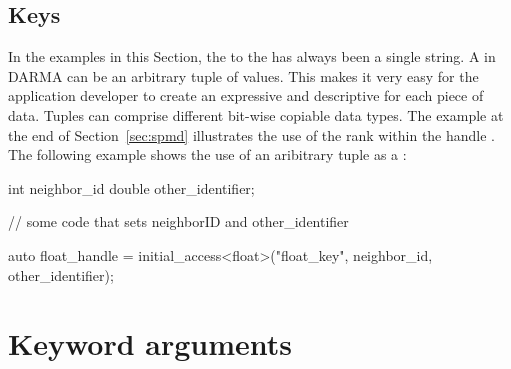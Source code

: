 \subsection{Keys}
\label{subsec:keys}
In the examples in this Section, the  to the
 has always been a single string. 
A  in DARMA 
can be an arbitrary \gls{tuple} of values.  This 
makes it very easy for the application developer to create an expressive
and descriptive  for each piece of data.  Tuples can comprise
different bit-wise copiable data types.  The example at the end of
Section~\ref{sec:spmd} illustrates the use of the \gls{rank} within the handle
.  The following example shows the use of an
aribitrary \gls{tuple} as a :
\begin{CppCode}
  int neighbor_id
  double other_identifier;

  // some code that sets neighborID and other_identifier
  
  auto float_handle = initial_access<float>("float_key", 
                                            neighbor_id, 
                                            other_identifier);
\end{CppCode}


\section{Keyword arguments}
\label{sec:keyword}



